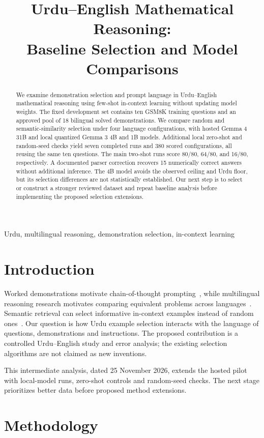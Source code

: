 \documentclass[conference]{IEEEtran}
\title{Urdu--English Mathematical Reasoning:\\Baseline Selection and Model Comparisons}
\author{\IEEEauthorblockN{Ammar Anees, Hussain Baqar, Rayyan Hasib, and Saad ur Rehman}}
\begin{document}
\maketitle
\begin{abstract}
We examine demonstration selection and prompt language in Urdu--English mathematical reasoning using few-shot in-context learning without updating model weights. The fixed development set contains ten GSM8K training questions and an approved pool of 18 bilingual solved demonstrations. We compare random and semantic-similarity selection under four language configurations, with hosted Gemma 4 31B and local quantized Gemma 3 4B and 1B models. Additional local zero-shot and random-seed checks yield seven completed runs and 380 scored configurations, all reusing the same ten questions. The main two-shot runs score 80/80, 64/80, and 16/80, respectively. A documented parser correction recovers 15 numerically correct answers without additional inference. The 4B model avoids the observed ceiling and Urdu floor, but its selection differences are not statistically established. Our next step is to select or construct a stronger reviewed dataset and repeat baseline analysis before implementing the proposed selection extensions.
\end{abstract}
\begin{IEEEkeywords}
Urdu, multilingual reasoning, demonstration selection, in-context learning
\end{IEEEkeywords}

\section{Introduction}
Worked demonstrations motivate chain-of-thought prompting~\cite{wei}, while multilingual reasoning research motivates comparing equivalent problems across languages~\cite{shi}. Semantic retrieval can select informative in-context examples instead of random ones~\cite{liu}. Our question is how Urdu example selection interacts with the language of questions, demonstrations and instructions. The proposed contribution is a controlled Urdu--English study and error analysis; the existing selection algorithms are not claimed as new inventions.

This intermediate analysis, dated 25 November 2026, extends the hosted pilot with local-model runs, zero-shot controls and random-seed checks. The next stage prioritizes better data before proposed method extensions.

\section{Methodology}
\end{document}

